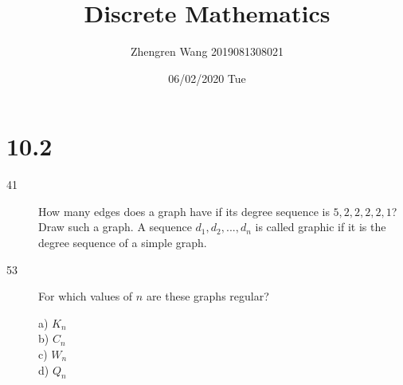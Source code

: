 \documentclass[UTF8]{article}
\title{Discrete Mathematics}
\author{Zhengren Wang 2019081308021}
\date{06/02/2020 Tue}
\begin{document}
\maketitle 

\part{10.2}
\begin{description}
    \item[41]How many edges does a graph have if its degree sequence is $5, 2, 2, 2, 2, 1$? Draw such a graph.  A sequence $d_1, d_2,...,d_n$ is called graphic if it is the degree sequence of a simple graph. \\


    \item[53]For which values of $n$ are these graphs regular? 

            a) $K_n$                                              \\
            b) $C_n$                                              \\
            c) $W_n$                                              \\
            d) $Q_n$                                              \\

\end{description}
\end{document}

